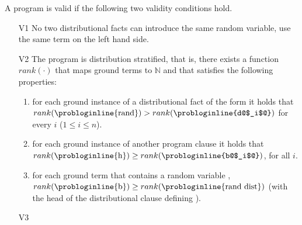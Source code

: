 \begin{theorem} \label{theo:valid_dcproblog}
A \dcproblogsty program is valid if the following two validity conditions hold.
	\begin{itemize}
	    \item[V1] No two distributional facts can introduce the same random variable, \ie use the same term on the left hand side.
		\item[V2] The program \dcpprogram is distribution stratified, that is, there exists a function $rank(\cdot)$ that maps ground terms to $\mathbb{N}$ and that satisfies the following properties:
		\begin{enumerate}			
			\item for each ground instance of a distributional fact of the form \linebreak {} it holds that   $rank(\text{\probloginline{rand}})>rank(\text{\probloginline{d@$_i$@}})$ for every $i$ ($1\leq i \leq n$).
			\item for each ground instance of another program clause  it holds that $rank(\text{\probloginline{h}})\geq rank(\text{\probloginline{b@$_i$@}})$, for all $i$.
			\item for each ground term  that contains a random variable , $rank(\text{\probloginline{b}})\geq rank(\text{\probloginline{rand~dist}})$ (with  the head of the distributional clause defining ).
		\end{enumerate}
	    \item[V3] 
	\end{itemize}
\end{theorem}












